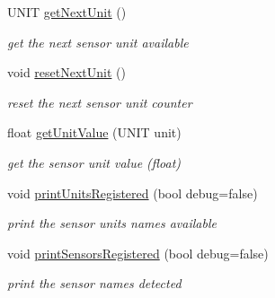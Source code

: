 \begin{DoxyCompactItemize}
U\+N\+IT \hyperlink{classSensors_ad33c76f341c86ac1900c5953fca9c0d1}{get\+Next\+Unit} ()
\begin{DoxyCompactList}\small\item\em get the next sensor unit available \end{DoxyCompactList}\item 
\mbox{\label{classSensors_ae6ac6080b6ad79ba9cd441646826058d}} 
void \hyperlink{classSensors_ae6ac6080b6ad79ba9cd441646826058d}{reset\+Next\+Unit} ()
\begin{DoxyCompactList}\small\item\em reset the next sensor unit counter \end{DoxyCompactList}\item 
float \hyperlink{classSensors_a7e75dd4e3f2e655a9961f57650cbf749}{get\+Unit\+Value} (U\+N\+IT unit)
\begin{DoxyCompactList}\small\item\em get the sensor unit value (float) \end{DoxyCompactList}\item 
void \hyperlink{classSensors_a0e9516d728256efd1eba97ef834cd385}{print\+Units\+Registered} (bool debug=false)
\begin{DoxyCompactList}\small\item\em print the sensor units names available \end{DoxyCompactList}\item 
void \hyperlink{classSensors_aed05af978baed0801ff4de5f1c367cf0}{print\+Sensors\+Registered} (bool debug=false)
\begin{DoxyCompactList}\small\item\em print the sensor names detected \end{DoxyCompactList}\end{DoxyCompactItemize}

